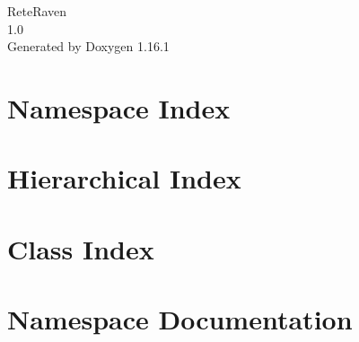 \documentclass[twoside]{book}
\newcommand{\+}{\discretionary{\mbox{\scriptsize$\hookleftarrow$}}{}{}}
\newcommand{\clearemptydoublepage}{%
    \newpage{\pagestyle{empty}\cleardoublepage}%
  }
\begin{document}
  \raggedbottom
    \hypersetup{pageanchor=false,
                bookmarksnumbered=true,
                pdfencoding=unicode
               }
  \begin{titlepage}
  \vspace*{7cm}
  \begin{center}%
  {\Large Rete\+Raven}\\
  [1ex]\large 1.\+0 \\
  \vspace*{1cm}
  {\large Generated by Doxygen 1.16.1}\\
  \end{center}
  \end{titlepage}
  \clearemptydoublepage
  \tableofcontents
  \clearemptydoublepage
  \hypersetup{pageanchor=true}
\chapter{Namespace Index}

\chapter{Hierarchical Index}

\chapter{Class Index}

\chapter{Namespace Documentation}


\end{document}
